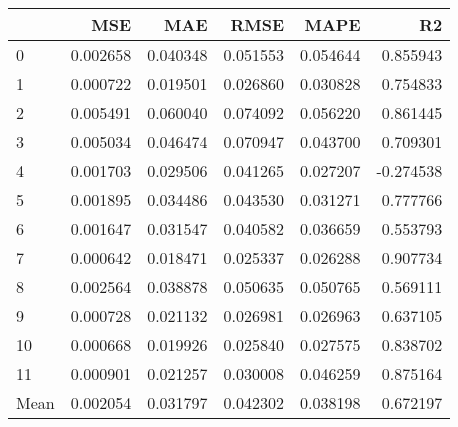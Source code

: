 \begin{tabular}{lrrrrr}
\toprule
 & MSE & MAE & RMSE & MAPE & R2 \\
\midrule
0 & 0.002658 & 0.040348 & 0.051553 & 0.054644 & 0.855943 \\
1 & 0.000722 & 0.019501 & 0.026860 & 0.030828 & 0.754833 \\
2 & 0.005491 & 0.060040 & 0.074092 & 0.056220 & 0.861445 \\
3 & 0.005034 & 0.046474 & 0.070947 & 0.043700 & 0.709301 \\
4 & 0.001703 & 0.029506 & 0.041265 & 0.027207 & -0.274538 \\
5 & 0.001895 & 0.034486 & 0.043530 & 0.031271 & 0.777766 \\
6 & 0.001647 & 0.031547 & 0.040582 & 0.036659 & 0.553793 \\
7 & 0.000642 & 0.018471 & 0.025337 & 0.026288 & 0.907734 \\
8 & 0.002564 & 0.038878 & 0.050635 & 0.050765 & 0.569111 \\
9 & 0.000728 & 0.021132 & 0.026981 & 0.026963 & 0.637105 \\
10 & 0.000668 & 0.019926 & 0.025840 & 0.027575 & 0.838702 \\
11 & 0.000901 & 0.021257 & 0.030008 & 0.046259 & 0.875164 \\
Mean & 0.002054 & 0.031797 & 0.042302 & 0.038198 & 0.672197 \\
\bottomrule
\end{tabular}
